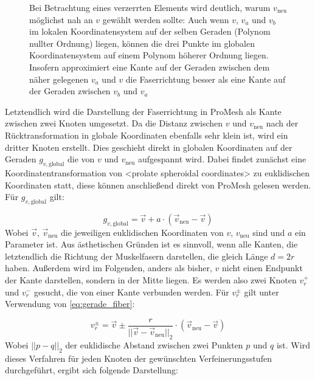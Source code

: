 \documentclass[
	a4paper,			%
	11pt,				%
	headsepline,		%
	bibtotoc,			%
	BCOR18mm,      		%
	DIV14,				%
	headings=normal,
	numbers=noenddot,
]{scrbook}
\theoremstyle{mythmstyle}
\theoremstyle{other}
\begin{document}
\begin{figure}[h]
	\caption{Bei Betrachtung eines verzerrten Elements wird deutlich, warum $v_{\text{neu}}$ möglichst nah an $v$
	 gewählt werden sollte:
	Auch wenn $v$, $v_a$ und $v_b$ im lokalen Koordinatensystem
	auf der selben Geraden (Polynom nullter Ordnung) liegen, 
	können die drei Punkte im globalen Koordinatensystem auf einem Polynom
	höherer Ordnung liegen. Insofern approximiert eine Kante auf der Geraden zwischen dem näher gelegenen
	$v_a$ und $v$ die Faserrichtung besser als eine Kante auf der Geraden zwischen $v_b$ und $v_a$ }
	\label{figure:distance_v_vnew}
	\end{figure}
	\clearpage
	Letztendlich wird die Darstellung der Faserrichtung in ProMesh als Kante zwischen zwei Knoten umgesetzt. 
	Da die Distanz zwischen $v$ und
	 $v_{\text{neu}}$ nach der Rücktransformation in globale Koordinaten ebenfalls sehr klein ist, wird ein 
	 dritter Knoten erstellt. Dies geschieht direkt in globalen Koordinaten auf der Geraden $g_{v,\text{global}}$
	  die von $v$ und
	 $v_{\text{neu}}$ aufgespannt wird. Dabei findet zunächst eine Koordinatentransformation von <prolate
	 spheroidal coordinates> zu euklidischen Koordinaten statt, diese können anschließend direkt von
	 ProMesh gelesen werden. Für $g_{v,\text{global}}$ gilt:
	 
	 \begin{equation}
	 g_{v,\text{global}} = \vec{v} + a \cdot (\vec{v}_{\text{neu}} - \vec{v})
	 \label{global_gerade_fiber}
	 \end{equation}
	Wobei $\vec{v}$, $\vec{v}_{\text{neu}}$ die jeweiligen euklidischen Koordinaten von $v$, $v_{\text{neu}}$
	sind und $a$ ein Parameter ist. Aus ästhetischen Gründen ist es sinnvoll, wenn alle Kanten, die letztendlich
	die Richtung der Muskelfasern darstellen, die gleich Länge $d =2r$ haben. Außerdem wird im Folgenden,
	anders als bisher, $v$ nicht einen Endpunkt der Kante darstellen, sondern in der Mitte liegen. Es werden
	also zwei Knoten $v_r^+$ und $v_r^-$ gesucht, die von einer Kante verbunden werden. Für $v_r^{\pm}$
	gilt unter Verwendung von \autoref{eq:gerade_fiber}:
	 
	 \begin{equation}
	 v_r^{\pm} = \vec{v} \pm \frac{r}{||\vec{v}-\vec{v}_{\text{neu}}||_2} \cdot (\vec{v}_{\text{neu}} - \vec{v})
	 \label{global_gerade_fiber}
	 \end{equation}
	 Wobei $||p - q||_2$ der euklidische Abstand zwischen zwei Punkten $p$ und $q$ ist.
	Wird dieses Verfahren für jeden Knoten der gewünschten Verfeinerungsstufen durchgeführt, ergibt sich folgende
	Darstellung:
\end{document}
